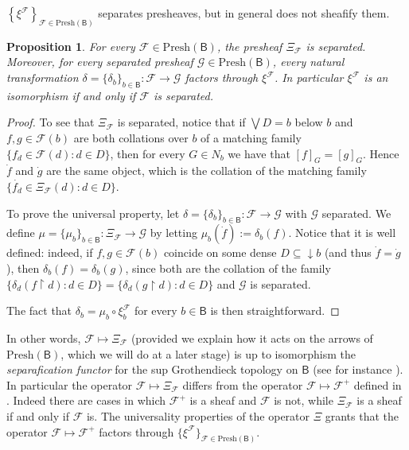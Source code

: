 \documentclass[11pt]{amsart}
\newcommand{\F}{\mathcal{F}}
\newcommand{\G}{\mathcal{G}}
\newcommand{\Presh}{\textrm{Presh}}
\theoremstyle{plain}
\newtheorem{proposition}[theorem]{Proposition}
\theoremstyle{definition}
\theoremstyle{plain}
\theoremstyle{remark}
\newcommand{\bool}[1]{\mathsf{#1}}
\newcommand{\bp}[1]{\left\lbrace #1 \right\rbrace}
\newcommand{\0}{\mathsf{0}}
\renewcommand{\1}{\mathsf{1}}
\renewcommand{\2}{\mathsf{2}}
\theoremstyle{definition}
\begin{document}
$\bp{\xi^\F}_{\F\in\Presh(\bool{B})}$ separates presheaves, but in general does not sheafify them.
\begin{proposition}\label{prop:univJsep}
For every $\F\in\Presh(\bool{B})$, the presheaf $\Xi_\F$ is separated. Moreover, for every separated presheaf $\G\in\Presh(\bool{B})$, every natural transformation $\delta=\{\delta_b\}_{b\in \bool{B}}:\F\to\G$ factors through $\xi^{\F}$. In particular $\xi^\F$ is an isomorphism if and only if $\F$ is separated.

\end{proposition}
\begin{proof}
To see that $\Xi_\F$ is separated, notice that if $\bigvee D=b$ below $b$ and $f, g\in\F(b)$ are both collations over $b$ of a matching family $\{f_d\in\F(d): d\in D\}$, then for every $G\in N_b$ we have that $[f]_{G}=[g]_{G}$. Hence $\dot{f}$ and $\dot{g}$ are the same object, which is the collation of the matching family $\{\dot{f_d}\in\Xi_\F(d): d\in D\}$.

To prove the universal property, let $\delta=\{\delta_b\}_{b\in \bool{B}}:\F\to\G$ with $\G$ separated. We define $\mu=\{\mu_b\}_{b\in\bool{B}}:\Xi_\F\to\G$ by letting $\mu_b(\dot{f}):=\delta_b(f)$. Notice that it is well defined: indeed, if $f, g\in\F(b)$ coincide on some dense $D\subseteq\downarrow b$ (and thus $\dot{f}=\dot{g}$), then $\delta_b(f)=\delta_b(g)$, since both are the collation of the family $\{\delta_d(f\restriction d): d\in D\}=\{\delta_d(g\restriction d): d\in D\}$ and $\G$ is separated. 

The fact that $\delta_b=\mu_b\circ\xi^{\F}_b$ for every $b\in\bool{B}$ is then straightforward.
\end{proof}
In other words, $\F\mapsto \Xi_\F$ (provided we explain how it acts on the arrows of $\Presh(\bool{B})$, which we will do at a later stage) is up to isomorphism the \emph{separafication functor} for the sup Grothendieck topology on $\bool{B}$ (see for instance \cite[page 43]{VistNotes}). In particular the operator $\F\mapsto\Xi_\F$ differs from the operator $\F\mapsto\F^+$  defined in \cite[Section III.5]{MacLMoer}. Indeed there are cases in which $\F^+$ is a sheaf and $\F$ is not, while $\Xi_\F$ is a sheaf if and only if $\F$ is. The universality properties of the operator $\Xi$ grants that the operator $\F\mapsto\F^+$ factors through $\{\xi^\F\}_{\F\in\Presh(\bool{B})}$.
\end{document}
